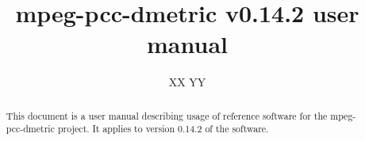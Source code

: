 \documentclass[a4paper,11pt]{mpegdoc}
\title{mpeg-pcc-dmetric v0.14.2 user manual}
\author{%
XX YY \email{xx@yy.com}
}
\begin{document}

\titlespacing{\section}{0pt}{4ex}{3ex}
\titlespacing{\subsection}{0pt}{3ex}{2ex}
\titlespacing{\subsubsection}{0pt}{1ex}{1ex}

\begin{abstract}
This document is a user manual describing usage of reference software
for the mpeg-pcc-dmetric project. It applies to version 0.14.2 of the software.
\end{abstract}
\newpage
\tableofcontents

\newpage







%
\end{document}
